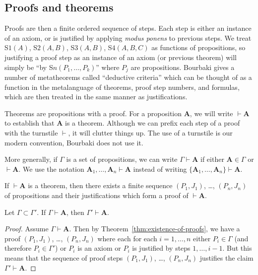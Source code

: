 \documentclass{amsart}%
\newcommand\metavariable[1]{\boldsymbol{#1}}
\begin{document}
\subsection{Proofs and theorems}
Proofs are then a finite ordered sequence of steps. Each step is either
an instance of an axiom, or is justified by applying \textit{modus ponens}
to previous steps. We treat S$1(A)$, S$2(A,B)$, S$3(A,B)$, S$4(A,B,C)$
as functions of propositions, so justifying a proof step as an instance
of an axiom (or previous theorem) will simply be ``by S$n(P_{1},\dots,P_{k})$''
where $P_{j}$ are propositions. Bourbaki gives a number of metatheorems
called ``deductive criteria'' which can be thought of as a function in
the metalanguage of theorems, proof step numbers, and formulas,
which are then treated in the same manner as justifications.

Theorems are propositions with a proof. For a proposition
$\metavariable{A}$, we will write $\vdash\metavariable{A}$ to establish
that $\metavariable{A}$ is a theorem. Although we can prefix each step
of a proof with the turnstile $\vdash$, it will clutter things up.
The use of a turnstile is our modern convention, Bourbaki does not use
it.

More generally, if $\Gamma$ is a set of propositions, we can write
$\Gamma\vdash\metavariable{A}$ if either $\metavariable{A}\in\Gamma$ or
$\vdash\metavariable{A}$. We use the notation
$\metavariable{A}_{1},\dots,\metavariable{A}_{n}\vdash\metavariable{A}$
instead of writing $\{\metavariable{A}_{1},\dots,\metavariable{A}_{n}\}\vdash\metavariable{A}$.

\begin{theorem}\label{thm:existence-of-proofs}
If $\vdash\metavariable{A}$ is a theorem,
then there exists a finite sequence $(P_{1},J_{1})$, \dots, $(P_{n},J_{n})$ of
propositions and their justifications which form a proof of
$\vdash\metavariable{A}$.
\end{theorem}

\begin{theorem}[Weakening]
Let $\Gamma\subset\Gamma'$.
If $\Gamma\vdash\metavariable{A}$, then $\Gamma'\vdash\metavariable{A}$.
\end{theorem}

\begin{proof}
Assume $\Gamma\vdash\metavariable{A}$.
Then by Theorem~\ref{thm:existence-of-proofs}, we have a proof
$(P_{1},J_{1})$, \dots, $(P_{n},J_{n})$ where each for each
$i=1,\dots,n$ either $P_{i}\in\Gamma$ (and therefore $P_{i}\in\Gamma'$)
or $P_{i}$ is an axiom or $P_{i}$ is justified by steps $1,\dots,i-1$.
But this means that the sequence of proof steps
$(P_{1},J_{1})$, \dots, $(P_{n},J_{n})$ justifies the claim
$\Gamma'\vdash\metavariable{A}$.
\end{proof}
\end{document}
